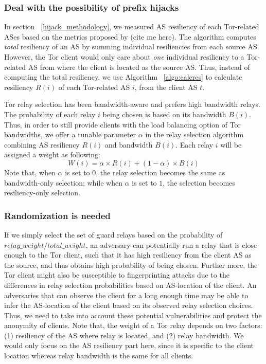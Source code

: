 \subsubsection{Deal with the possibility of prefix hijacks}

In section ~\ref{hijack_methodology}, we measured AS resiliency of each Tor-related ASes based on the metrics proposed by (cite me here). The algorithm computes \emph{total} resiliency of an AS by summing individual resiliencies from each source AS. However, the Tor client would only care about \emph{one} individual resiliency to a Tor-related AS from where the client is located as the source AS. Thus, instead of computing the total resiliency, we use Algorithm ~\ref{algo:calcres} to calculate resiliency $R(i)$ of each Tor-related AS $i$, from the client AS $t$. 

Tor relay selection has been bandwidth-aware and prefers high bandwidth relays. The probability of each relay $i$ being chosen is based on its bandwidth $B(i)$. Thus, in order to still provide clients with the load balancing option of Tor bandwidths, we offer a tunable parameter $\alpha$ in the relay selection algorithm combining AS resiliency $R(i)$ and bandwidth $B(i)$. Each relay $i$ will be assigned a weight as following:
\begin{equation*}
W(i) = \alpha \times R(i) + (1 - \alpha) \times B(i)
\end{equation*}
Note that, when $\alpha$ is set to $0$, the relay selection becomes the same as bandwidth-only selection; while when $\alpha$ is set to $1$, the selection becomes resiliency-only selection. 

\subsubsection{Randomization is needed}

If we simply select the set of guard relays based on the probability of $relay\_weight/total\_weight$, an adversary can potentially run a relay that is close enough to the Tor client, such that it has high resiliency from the client AS as the source, and thus obtains high probability of being chosen. Further more, the Tor client might also be susceptible to fingerprinting attacks due to the differences in relay selection probabilities based on AS-location of the client. An adversaries that can observe the client for a long enough time may be able to infer the AS-location of the client based on its observed relay selection choices. Thus, we need to take into account these potential vulnerabilities and protect the anonymity of clients. Note that, the weight of a Tor relay depends on two factors: (1) resiliency of the AS where relay is located, and (2) relay bandwidth. We would only focus on the AS resiliency part here, since it is specific to the client location whereas relay bandwidth is the same for all clients. 

